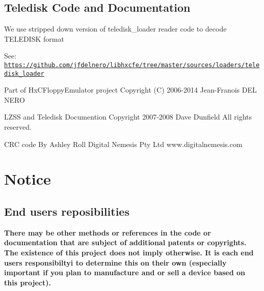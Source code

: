 \subsection*{Teledisk Code and Documentation}


\begin{DoxyItemize}
\item We use stripped down version of teledisk\+\_\+loader reader code to decode T\+E\+L\+E\+D\+I\+SK format
\begin{DoxyItemize}
\item See\+: \href{https://github.com/jfdelnero/libhxcfe/tree/master/sources/loaders/teledisk_loader}{\tt https\+://github.\+com/jfdelnero/libhxcfe/tree/master/sources/loaders/teledisk\+\_\+loader}
\begin{DoxyItemize}
\item Part of Hx\+C\+Floppy\+Emulator project Copyright (C) 2006-\/2014 Jean-\/\+Franois D\+EL N\+E\+RO
\item L\+Z\+SS and Teledisk Documention Copyright 2007-\/2008 Dave Dunfield All rights reserved.
\item C\+RC code By Ashley Roll Digital Nemesis Pty Ltd www.\+digitalnemesis.\+com 


\end{DoxyItemize}
\end{DoxyItemize}
\end{DoxyItemize}

\section*{Notice}

\subsection*{End users reposibilities}

{\bfseries There may be other methods or references in the code or documentation that are subject of additional patents or copyrights. The existence of this project does not imply otherwise. It is each end users responsibiltyi to determine this on their own (especially important if you plan to manufacture and or sell a device based on this project).} 